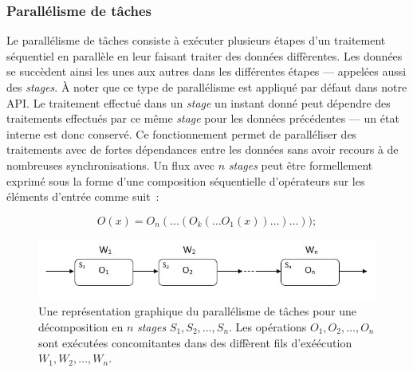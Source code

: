 


\subsubsection{Parall\'elisme de t\^aches}

Le parall\'elisme de t\^aches consiste \`a ex\'ecuter plusieurs \'etapes d'un traitement s\'equentiel en parall\`ele en leur faisant traiter des données diff\`erentes. Les donn\'ees se succ\`edent ainsi les unes aux autres dans les diff\'erentes \'etapes --- appel\'ees  aussi des \emph{stages}. \`A noter que ce type de parall\'elisme est appliqu\'e par d\'efaut dans notre API. Le traitement effectu\'e dans un \emph{stage} un instant donn\'e peut d\'ependre des traitements effectu\'es par ce m\^eme \emph{stage} pour les donn\'ees pr\'ec\'edentes --- un \'etat interne est donc conserv\'e. Ce fonctionnement permet de parall\'eliser des traitements avec de fortes d\'ependances entre les donn\'ees sans avoir recours \`a de nombreuses synchronisations. 
Un flux avec $n$ \emph{stages} peut \^etre formellement exprim\'e sous la forme d'une composition s\'equentielle d'op\'erateurs sur les \'el\'ements d'entr\'ee comme suit~: 

\[
	O(x) = O_n( \ldots (O_k( \ldots O_1(x)) \ldots ) \ldots ));
\]


\begin{figure}[ht]
\centering
     \includegraphics[width=1.0\textwidth]{Figures/ParallelismeDuFlux.jpg}
      \caption[Une repr\'esentation graphique du parall\'elisme de t\^aches.]{Une repr\'esentation graphique du parall\'elisme de t\^aches pour une d\'ecomposition en $n$ \emph{stages} $S_1, S_2, \ldots, S_n$. Les op\'erations $O_1, O_2, \ldots, O_n$ sont ex\'ecut\'ees concomitantes dans des diff\`erent fils d'ex\'eécution $W_1, W_2, \ldots, W_n$.}
       \label{ParallelismeDuFlux.fig}
\end{figure}


